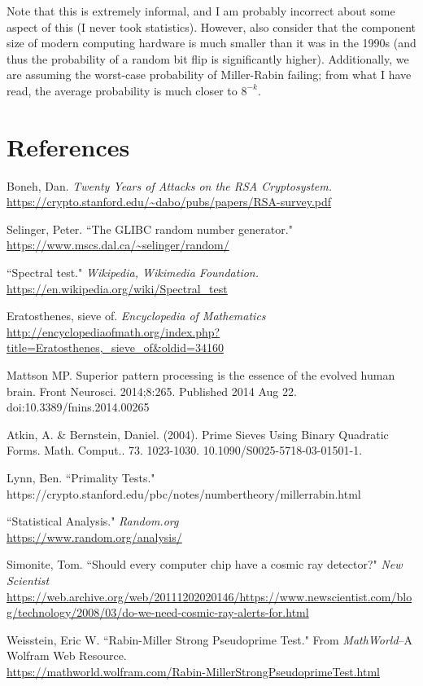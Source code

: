 \documentclass{article}
\begin{document}
Note that this is extremely informal, and I am probably incorrect about some aspect of this (I never took statistics). However, also consider that the component size of modern computing hardware is much smaller than it was in the 1990s (and thus the probability of a random bit flip is significantly higher). Additionally, we are assuming the worst-case probability of Miller-Rabin failing; from what I have read, the average probability is much closer to $8^{-k}$.


\clearpage
\section{References}
\begin{thebibliography}{6}
Boneh, Dan. \textit{Twenty Years of Attacks on the RSA Cryptosystem.}
\\\url{https://crypto.stanford.edu/~dabo/pubs/papers/RSA-survey.pdf}

Selinger, Peter. ``The GLIBC random number generator."
\\\url{https://www.mscs.dal.ca/~selinger/random/}

``Spectral test." \textit{Wikipedia, Wikimedia Foundation.}
\\\url{https://en.wikipedia.org/wiki/Spectral_test}

Eratosthenes, sieve of.
\textit{Encyclopedia of Mathematics}\\
\url{http://encyclopediaofmath.org/index.php?title=Eratosthenes,_sieve_of&oldid=34160}

Mattson MP. Superior pattern processing is the essence of the evolved human brain. Front Neurosci. 2014;8:265. Published 2014 Aug 22. doi:10.3389/fnins.2014.00265

Atkin, A. \& Bernstein, Daniel. (2004). Prime Sieves Using Binary Quadratic Forms. Math. Comput.. 73. 1023-1030. 10.1090/S0025-5718-03-01501-1. 

Lynn, Ben. ``Primality Tests."
https://crypto.stanford.edu/pbc/notes/numbertheory/millerrabin.html

``Statistical Analysis." \textit{Random.org}
\\\url{https://www.random.org/analysis/}

Simonite, Tom. ``Should every computer chip have a cosmic ray detector?" \textit{New Scientist}
\\\url{https://web.archive.org/web/20111202020146/https://www.newscientist.com/blog/technology/2008/03/do-we-need-cosmic-ray-alerts-for.html}

Weisstein, Eric W. ``Rabin-Miller Strong Pseudoprime Test." From \textit{MathWorld}--A Wolfram Web Resource.
\\\url{https://mathworld.wolfram.com/Rabin-MillerStrongPseudoprimeTest.html}
\end{thebibliography}
         
\end{document}
